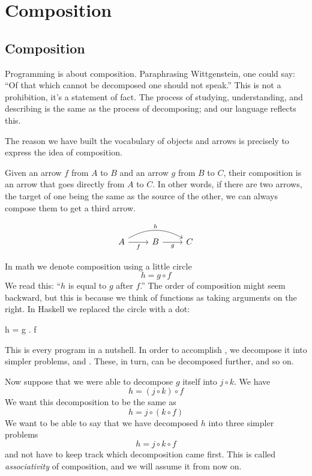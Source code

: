 \documentclass[DaoFP]{subfiles}
\begin{document}
\setcounter{chapter}{1}
\chapter{Composition}

\section{Composition}

Programming is about composition. Paraphrasing Wittgenstein, one could say: ``Of that which cannot be decomposed one should not speak.'' This is not a prohibition, it's a statement of fact. The process of studying, understanding, and describing is the same as the process of decomposing; and our language reflects this. 

The reason we have built the vocabulary of objects and arrows is precisely to express the idea of composition.  

Given an arrow $f$ from $A$ to $B$ and an arrow $g$ from $B$ to $C$, their composition is an arrow that goes directly from $A$ to $C$. In other words, if there are two arrows, the target of one being the same as the source of the other, we can always compose them to get a third arrow.

\[
 \begin{tikzcd}
 A
 \arrow[rr, bend left, "h"]
 \arrow[r, "f"']
 & B
 \arrow[r, "g"']
& C
 \end{tikzcd}
\]

In math we denote composition using a little circle
\[h = g \circ f\]
We read this: ``$h$ is equal to $g$ after $f$.'' The order of composition might seem backward, but this is because we think of functions as taking arguments on the right.
In Haskell we replaced the circle with a dot:
\begin{haskell}
h = g . f
\end{haskell}
This is every program in a nutshell. In order to accomplish , we decompose it into simpler problems,  and . These, in turn, can be decomposed further, and so on.

Now suppose that we were able to decompose $g$ itself into $j \circ k$. We have
\[h = (j \circ k) \circ f\]
We want this decomposition to be the same as
\[h = j \circ (k \circ f)\]
We want to be able to say that we have decomposed $h$ into three simpler problems
\[h =  j \circ k \circ f\]
and not have to keep track which decomposition came first. This is called \emph{associativity} of composition, and we will assume it from now on.
\end{document}
